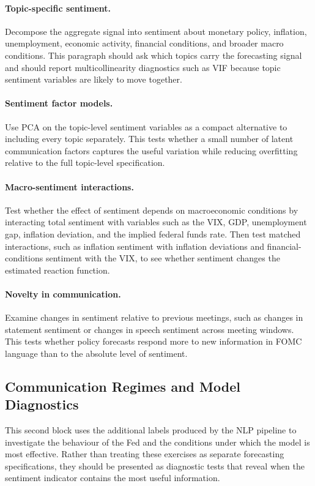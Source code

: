 \documentclass[11pt]{article}
\begin{document}
\paragraph{Topic-specific sentiment.} Decompose the aggregate signal into sentiment about monetary policy, inflation, unemployment, economic activity, financial conditions, and broader macro conditions. This paragraph should ask which topics carry the forecasting signal and should report multicollinearity diagnostics such as VIF because topic sentiment variables are likely to move together.

\paragraph{Sentiment factor models.} Use PCA on the topic-level sentiment variables as a compact alternative to including every topic separately. This tests whether a small number of latent communication factors captures the useful variation while reducing overfitting relative to the full topic-level specification.

\paragraph{Macro-sentiment interactions.} Test whether the effect of sentiment depends on macroeconomic conditions by interacting total sentiment with variables such as the VIX, GDP, unemployment gap, inflation deviation, and the implied federal funds rate. Then test matched interactions, such as inflation sentiment with inflation deviations and financial-conditions sentiment with the VIX, to see whether sentiment changes the estimated reaction function.

\paragraph{Novelty in communication.} Examine changes in sentiment relative to previous meetings, such as changes in statement sentiment or changes in speech sentiment across meeting windows. This tests whether policy forecasts respond more to new information in FOMC language than to the absolute level of sentiment.

\subsection{Communication Regimes and Model Diagnostics}

This second block uses the additional labels produced by the NLP pipeline to investigate the behaviour of the Fed and the conditions under which the model is most effective. Rather than treating these exercises as separate forecasting specifications, they should be presented as diagnostic tests that reveal when the sentiment indicator contains the most useful information.
\end{document}
